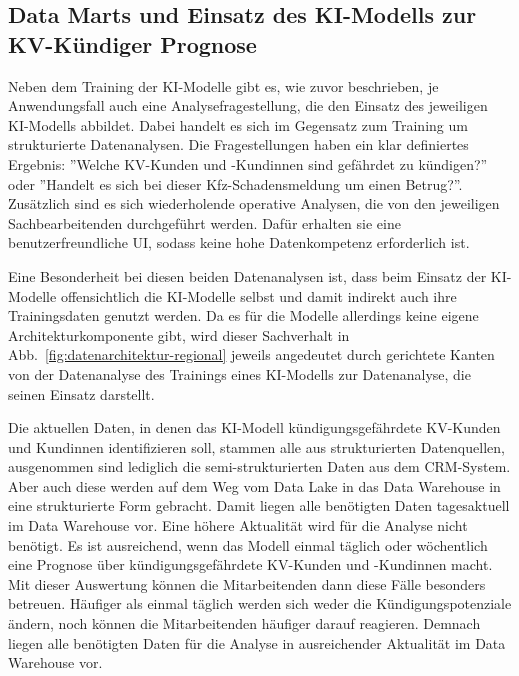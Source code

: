 \subsection{Data Marts und Einsatz des KI-Modells zur KV-Kündiger Prognose}

Neben dem Training der KI-Modelle gibt es, wie zuvor beschrieben,
je Anwendungsfall auch eine Analysefragestellung, 
die den Einsatz des jeweiligen KI-Modells abbildet.
Dabei handelt es sich im Gegensatz zum Training
um strukturierte Datenanalysen.
Die Fragestellungen haben ein klar definiertes Ergebnis:
''Welche KV-Kunden und -Kundinnen sind gefährdet zu kündigen?'' 
oder ''Handelt es sich bei dieser Kfz-Schadensmeldung um einen Betrug?''.
Zusätzlich sind es sich wiederholende operative Analysen, 
die von den jeweiligen Sachbearbeitenden durchgeführt werden.
Dafür erhalten sie eine benutzerfreundliche UI, 
sodass keine hohe Datenkompetenz erforderlich ist.  

Eine Besonderheit bei diesen beiden Datenanalysen ist,
dass beim Einsatz der KI-Modelle offensichtlich 
die KI-Modelle selbst und damit indirekt auch ihre Trainingsdaten
genutzt werden.
Da es für die Modelle allerdings keine eigene Architekturkomponente
gibt, wird dieser Sachverhalt in Abb.~\ref{fig:datenarchitektur-regional}
jeweils angedeutet durch gerichtete Kanten 
von der Datenanalyse des Trainings eines KI-Modells
zur Datenanalyse, die seinen Einsatz darstellt.

Die aktuellen Daten, in denen das KI-Modell
kündigungsgefährdete KV-Kunden und Kundinnen identifizieren soll,
stammen alle aus strukturierten Datenquellen, 
ausgenommen sind lediglich die semi-strukturierten Daten
aus dem CRM-System.
Aber auch diese werden auf dem Weg vom Data Lake in das 
Data Warehouse in eine strukturierte Form gebracht.
Damit liegen alle benötigten Daten tagesaktuell im Data Warehouse vor.
Eine höhere Aktualität wird für die Analyse nicht benötigt.
Es ist ausreichend, wenn das Modell einmal täglich oder wöchentlich
eine Prognose über kündigungsgefährdete KV-Kunden und -Kundinnen macht.
Mit dieser Auswertung können die Mitarbeitenden dann diese Fälle 
besonders betreuen.
Häufiger als einmal täglich werden sich weder die 
Kündigungspotenziale ändern, noch können die Mitarbeitenden
häufiger darauf reagieren.
Demnach liegen alle benötigten Daten für die Analyse 
in ausreichender Aktualität im Data Warehouse vor.

